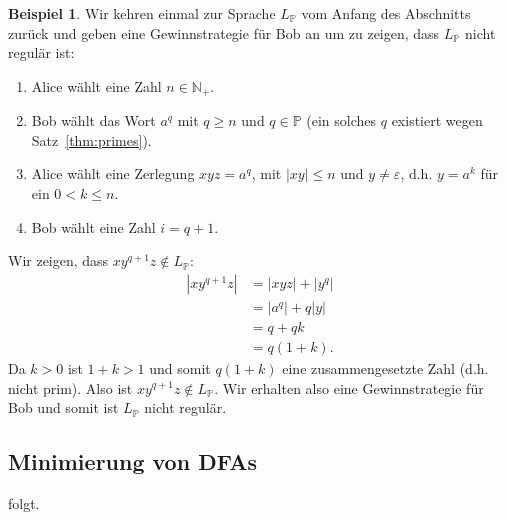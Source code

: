 \documentclass[11pt, a4paper]{article}
\theoremstyle{definition}
\newtheorem*{example*}{Beispiel}
\theoremstyle{plain}
\numberwithin{equation}{section}
\begin{document}
\begin{example*}
	Wir kehren einmal zur Sprache $L_\mathbb{P}$ vom Anfang des Abschnitts zurück und geben eine Gewinnstrategie für Bob an um zu zeigen, dass $L_\mathbb{P}$ nicht regulär ist:
	\begin{enumerate}[label=\arabic*)]
	\item Alice wählt eine Zahl $n \in \mathbb{N}_+$.
	\item Bob wählt das Wort $a^q$ mit $q \geq n$ und $q \in \mathbb{P}$ (ein solches $q$ existiert wegen Satz~\ref{thm:primes}).
	\item Alice wählt eine Zerlegung $xyz = a^q$, mit $|xy| \leq n$ und $y \neq \varepsilon$, d.h. $y = a^k$ für ein $0 < k \leq n$.
	\item Bob wählt eine Zahl $i = q+1$.
\end{enumerate}
Wir zeigen, dass $xy^{q+1}z \notin L_\mathbb{P}$:
\begin{align*}
	|xy^{q+1}z| &= |xyz| + |y^q|\\
	&= |a^q| + q |y|\\
	&= q + qk\\
	&= q(1 + k).
\end{align*}
Da $k > 0$ ist $1+k > 1$ und somit $q(1+k)$ eine zusammengesetzte Zahl (d.h. nicht prim). Also ist $xy^{q+1}z \notin L_\mathbb{P}$. Wir erhalten also eine Gewinnstrategie für Bob und somit ist $L_\mathbb{P}$ nicht regulär.
\end{example*}


\subsection{Minimierung von DFAs}\label{sec:regular_minimization}
folgt. %
\end{document}
